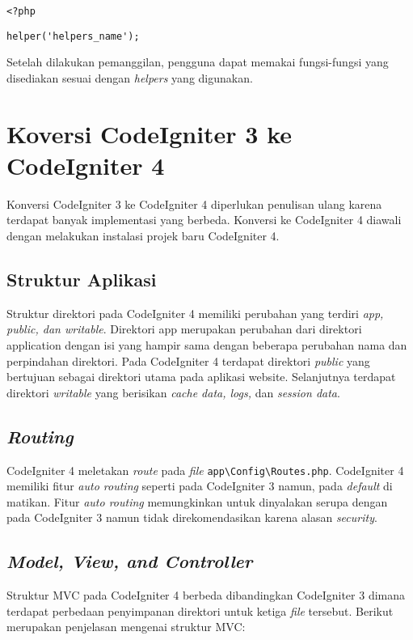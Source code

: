 \begin{center}
\verb|<?php|

\verb|helper('helpers_name');|
\end{center}
Setelah dilakukan pemanggilan, pengguna dapat memakai fungsi-fungsi yang disediakan sesuai dengan \textit{helpers} yang digunakan.

\section{Koversi CodeIgniter 3 ke CodeIgniter 4\cite{codeigniter:23:ci4}}
\label{sec:konversici3c4}
 
Konversi CodeIgniter 3 ke CodeIgniter 4 diperlukan penulisan ulang karena terdapat banyak implementasi yang berbeda. Konversi ke CodeIgniter 4 diawali dengan melakukan instalasi projek baru CodeIgniter 4.


\subsection{Struktur Aplikasi}

Struktur direktori pada CodeIgniter 4 memiliki perubahan yang terdiri \textit{app, public, dan writable}. Direktori app merupakan perubahan dari direktori application dengan isi yang hampir sama dengan beberapa perubahan nama dan perpindahan direktori. Pada CodeIgniter 4 terdapat direktori \textit{public} yang bertujuan sebagai direktori utama pada aplikasi website. Selanjutnya terdapat direktori \textit{writable} yang berisikan \textit{cache data, logs,} dan \textit{session data}.

\subsection{\textit{Routing}}

CodeIgniter 4 meletakan \textit{route} pada \textit{file} \verb|app\Config\Routes.php|. CodeIgniter 4 memiliki fitur \textit{auto routing} seperti pada CodeIgniter 3 namun, pada \textit{default} di matikan. Fitur \textit{auto routing} memungkinkan untuk dinyalakan serupa dengan pada CodeIgniter 3 namun tidak direkomendasikan karena alasan \textit{security}.
 
\subsection{\textit{Model, View, and Controller}}
 
Struktur MVC pada CodeIgniter 4 berbeda dibandingkan CodeIgniter 3 dimana terdapat perbedaan penyimpanan direktori untuk ketiga \textit{file} tersebut. Berikut merupakan penjelasan mengenai struktur MVC:

